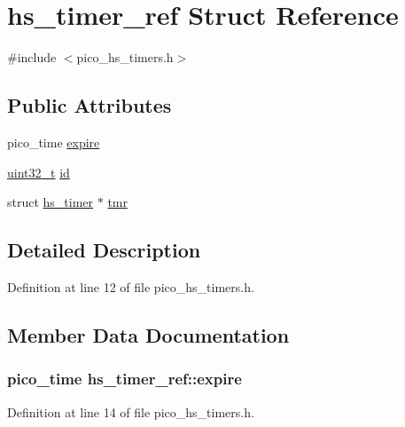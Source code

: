 \hypertarget{strucths__timer__ref}{\section{hs\-\_\-timer\-\_\-ref Struct Reference}
\label{strucths__timer__ref}
}


{\ttfamily \#include $<$pico\-\_\-hs\-\_\-timers.\-h$>$}

\subsection*{Public Attributes}
\begin{DoxyCompactItemize}
\item 
pico\-\_\-time \hyperlink{strucths__timer__ref_a55e4ec94c67d78dd307dd337fb1bac80}{expire}
\item 
\hyperlink{msus_2webserver_2uthash_8h_a435d1572bf3f880d55459d9805097f62}{uint32\-\_\-t} \hyperlink{strucths__timer__ref_a822feae9c1d2e9b2f5d705ec1fd0c3b2}{id}
\item 
struct \hyperlink{strucths__timer}{hs\-\_\-timer} $\ast$ \hyperlink{strucths__timer__ref_a92af37ae32ca421a4d5d6e63987544ea}{tmr}
\end{DoxyCompactItemize}


\subsection{Detailed Description}


Definition at line 12 of file pico\-\_\-hs\-\_\-timers.\-h.



\subsection{Member Data Documentation}
\hypertarget{strucths__timer__ref_a55e4ec94c67d78dd307dd337fb1bac80}{
\subsubsection[{expire}]{\setlength{\rightskip}{0pt plus 5cm}pico\-\_\-time hs\-\_\-timer\-\_\-ref\-::expire}}\label{strucths__timer__ref_a55e4ec94c67d78dd307dd337fb1bac80}


Definition at line 14 of file pico\-\_\-hs\-\_\-timers.\-h.


